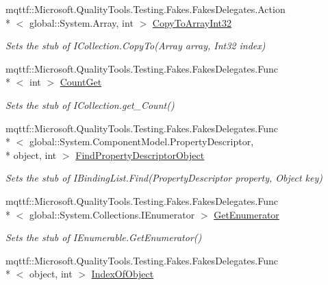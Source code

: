 \begin{DoxyCompactItemize}
mqttf\-::\-Microsoft.\-Quality\-Tools.\-Testing.\-Fakes.\-Fakes\-Delegates.\-Action\\*
$<$ global\-::\-System.\-Array, int $>$ \hyperlink{class_system_1_1_component_model_1_1_fakes_1_1_stub_i_binding_list_a0216a8515698361965f81a5d3c0b131b}{Copy\-To\-Array\-Int32}
\begin{DoxyCompactList}\small\item\em Sets the stub of I\-Collection.\-Copy\-To(\-Array array, Int32 index)\end{DoxyCompactList}\item 
mqttf\-::\-Microsoft.\-Quality\-Tools.\-Testing.\-Fakes.\-Fakes\-Delegates.\-Func\\*
$<$ int $>$ \hyperlink{class_system_1_1_component_model_1_1_fakes_1_1_stub_i_binding_list_a278b7b2de91dc9882a03808e622738b5}{Count\-Get}
\begin{DoxyCompactList}\small\item\em Sets the stub of I\-Collection.\-get\-\_\-\-Count()\end{DoxyCompactList}\item 
mqttf\-::\-Microsoft.\-Quality\-Tools.\-Testing.\-Fakes.\-Fakes\-Delegates.\-Func\\*
$<$ global\-::\-System.\-Component\-Model.\-Property\-Descriptor, \\*
object, int $>$ \hyperlink{class_system_1_1_component_model_1_1_fakes_1_1_stub_i_binding_list_ab4f33ec59879c244dce5aded913ade63}{Find\-Property\-Descriptor\-Object}
\begin{DoxyCompactList}\small\item\em Sets the stub of I\-Binding\-List.\-Find(\-Property\-Descriptor property, Object key)\end{DoxyCompactList}\item 
mqttf\-::\-Microsoft.\-Quality\-Tools.\-Testing.\-Fakes.\-Fakes\-Delegates.\-Func\\*
$<$ global\-::\-System.\-Collections.\-I\-Enumerator $>$ \hyperlink{class_system_1_1_component_model_1_1_fakes_1_1_stub_i_binding_list_ab3431e341cfe4d43e017d918f8680541}{Get\-Enumerator}
\begin{DoxyCompactList}\small\item\em Sets the stub of I\-Enumerable.\-Get\-Enumerator()\end{DoxyCompactList}\item 
mqttf\-::\-Microsoft.\-Quality\-Tools.\-Testing.\-Fakes.\-Fakes\-Delegates.\-Func\\*
$<$ object, int $>$ \hyperlink{class_system_1_1_component_model_1_1_fakes_1_1_stub_i_binding_list_a65068eb5eac5a39762aad8a25c4fe01b}{Index\-Of\-Object}

\end{DoxyCompactItemize}
